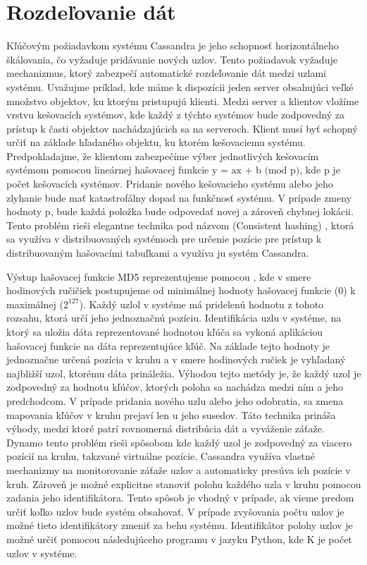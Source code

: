 \documentclass[11pt,twoside,a4paper]{book}
\begin{document}
\section{Rozdeľovanie dát}
Kľúčovým požiadavkom systému Cassandra je jeho schopnosť horizontálneho škálovania, čo vyžaduje pridávanie nových uzlov. Tento požiadavok vyžaduje mechanizmus, ktorý zabezpečí automatické rozdeľovanie dát medzi uzlami systému. Uvažujme príklad, kde máme k dispozícii jeden server obsahujúci veľké množstvo objektov, ku ktorým pristupujú klienti. Medzi server a klientov vložíme vrstvu kešovacích systémov, kde každý z týchto systémov bude zodpovedný za prístup k časti objektov nachádzajúcich sa na serveroch. Klient musí byť schopný určiť na základe hľadaného objektu, ku ktorém kešovaciemu systému. Predpokladajme, že klientom zabezpečíme výber jednotlivých kešovacím systémom pomocou lineárnej hašovacej funkcie $\textrm{y = ax + b (mod p)}$, kde p je počet kešovacích systémov. Pridanie nového kešovacieho systému alebo jeho zlyhanie bude mať katastrofálny dopad na funkčnosť systému. V prípade zmeny hodnoty p, bude každá položka bude odpovedať novej a zároveň chybnej lokácii. Tento problém rieši elegantne technika pod názvom \emph{} (Consistent hashing) \cite{Karger:1997:CHR:258533.258660}, ktorá sa využíva v distribuovaných systémoch pre určenie pozície pre prístup k distribuovaným hašovacími tabuľkami a využíva ju systém Cassandra.

Výstup hašovacej funkcie MD5 reprezentujeme pomocou , kde v smere hodinových ručičiek postupujeme od minimálnej hodnoty hašovacej funkcie (0) k maximálnej (${2^{127}}$). Každý uzlol v systéme má pridelenú hodnotu z tohoto rozsahu, ktorá určí jeho jednoznačnú pozíciu. Identifikácia uzlu v systéme, na ktorý sa uložia dáta reprezentované hodnotou kľúča sa vykoná aplikáciou hašovacej funkcie na dáta reprezentujúce kľúč. Na základe tejto hodnoty je jednoznačne určená pozícia v kruhu a v smere hodinových ručiek je vyhľadaný najbližší uzol, ktorému dáta prináležia. Výhodou tejto metódy je, že každý uzol je zodpovedný za hodnotu kľúčov, ktorých poloha sa nachádza medzi ním a jeho predchodcom. V prípade pridania nového uzlu alebo jeho odobratia, sa zmena mapovania kľúčov v kruhu prejaví len u jeho susedov. Táto technika prináša výhody, medzi ktoré patrí rovnomerná distribúcia dát a vyváženie záťaže. Dynamo tento problém rieši spôsobom kde každý uzol je zodpovedný za viacero pozícií na kruhu, takzvané virtuálne pozície. Cassandra využíva vlastné mechanizmy na monitorovanie záťaže uzlov a automaticky presúva ich pozície v kruh. Zároveň je možné explicitne stanoviť polohu každého uzla v kruhu pomocou zadania jeho identifikátora. Tento spôsob je vhodný v prípade, ak vieme predom určiť koľko uzlov bude systém obsahovať. V prípade zvyšovania počtu uzlov je možné tieto identifikátory zmeniť za behu systému. Identifikátor polohy uzlov je možné určiť pomocou následujúceho programu v jazyku Python, kde K je počet uzlov v systéme.
\end{document}

